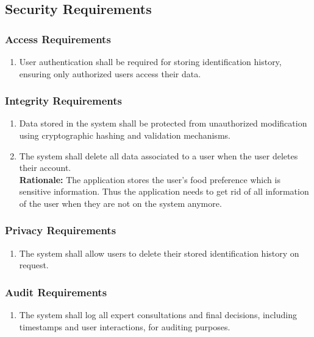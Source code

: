 \documentclass[]{article}
\begin{document}

\subsection{Security Requirements}
\label{sub:security_requirements}

\subsubsection{Access Requirements}
\label{ssub:access_requirements}
\begin{enumerate}[{SR-AC}1. ]
	\item User authentication shall be required for storing identification history, ensuring only authorized users access their data.
\end{enumerate}

\subsubsection{Integrity Requirements}
\label{ssub:integrity_requirements}
\begin{enumerate}[{SR-INT}1. ]
	\item Data stored in the system shall be protected from unauthorized modification using cryptographic hashing and validation mechanisms.
	\item The system shall delete all data associated to a user when the user deletes their account. \\
	\textbf{Rationale:} The application stores the user's food preference which is sensitive information. Thus the application needs to get rid of all information of the user when they are not on the system anymore.
\end{enumerate}

\subsubsection{Privacy Requirements}
\label{ssub:privacy_requirements}
\begin{enumerate}[{SR-P}1. ]
	\item The system shall allow users to delete their stored identification history on request.
\end{enumerate}

\subsubsection{Audit Requirements}
\label{ssub:audit_requirements}
\begin{enumerate}[{SR-AU}1. ]
	\item The system shall log all expert consultations and final decisions, including timestamps and user interactions, for auditing purposes.
\end{enumerate}
\end{document}
